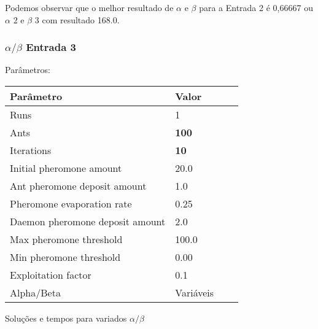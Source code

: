 \documentclass{article}
\begin{document}
\par

Podemos observar que o melhor resultado de $\alpha$ e $\beta$ para a Entrada 2 é 0,66667 ou $\alpha$ 2 e $\beta$ 3 com resultado 168.0. 






\newpage
\subsubsection{$\alpha/\beta$ Entrada 3}
\par Parâmetros:
\newline
\begin{center}
    \begin{tabular}{| l | l | l | l |}
    \hline
    Parâmetro & Valor \\ \hline
    Runs & 1 \\ \hline
    Ants & \textbf {100}\\ \hline
    Iterations & \textbf{10} \\ \hline
    Initial pheromone amount & 20.0 \\ \hline
    Ant pheromone deposit amount & 1.0 \\ \hline
    Pheromone evaporation rate & 0.25 \\ \hline
    Daemon pheromone deposit amount & 2.0 \\ \hline
    Max pheromone threshold & 100.0 \\ \hline
    Min pheromone threshold & 0.00 \\ \hline
    Exploitation factor & 0.1 \\ \hline
    Alpha/Beta & Variáveis \\ \hline
    \end{tabular}
\end{center}



\par
Soluções e tempos para variados $\alpha/\beta$
\newline
\end{document}
